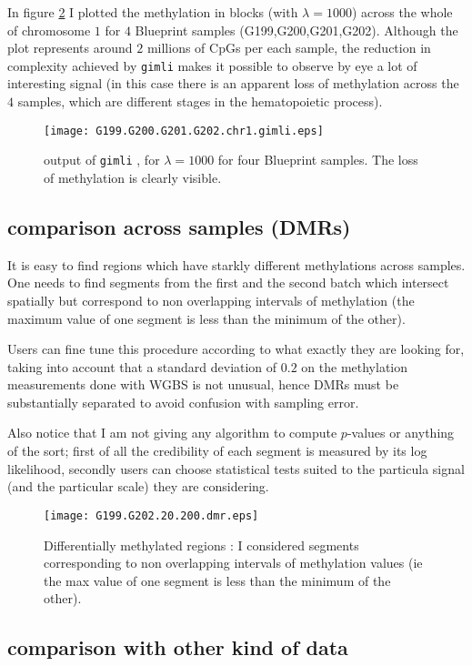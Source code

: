 \documentclass[11pt]{amsart}
\newcommand{\gimli}{\texttt{gimli} }
\begin{document}
In figure \ref{ex1} I plotted the methylation in blocks (with $\lambda=1000$) 
across the whole of chromosome $1$ for $4$ Blueprint samples
(G199,G200,G201,G202). Although the plot represents around $2$ millions of 
CpGs per each sample, the reduction in complexity achieved by \gimli makes it 
possible to observe by eye a lot of interesting signal (in this case there is 
an apparent loss of methylation across the $4$ samples, which are different 
stages in the hematopoietic process).

\begin{figure}\label{ex1}
\texttt{[image: G199.G200.G201.G202.chr1.gimli.eps]}
\caption{output of \gimli, for $\lambda=1000$ for four Blueprint samples. The loss of
methylation is clearly visible.}
\end{figure}

\subsection{comparison across samples (DMRs)}

It is easy to find regions which have starkly different 
methylations across samples. One needs to find segments 
from the first and the second batch which intersect spatially
but correspond to non overlapping intervals of methylation 
(the maximum value of one 
segment is less than the minimum of the other).

Users can fine tune this procedure according to what exactly they 
are looking for, taking into account that a standard deviation of $0.2$
on the methylation measurements done with WGBS is not unusual, hence
DMRs must be substantially separated to avoid confusion with sampling error.

Also notice that I am not giving any algorithm to compute $p$-values
or anything of the sort; first of all the credibility of each segment
is measured by its log likelihood, secondly users can choose statistical
tests suited to the particula signal (and the particular scale)
they are considering.

\begin{figure}\label{ex1}
\texttt{[image: G199.G202.20.200.dmr.eps]}
\caption{Differentially methylated regions : I considered segments corresponding to
non overlapping intervals of methylation values (ie the max value of one 
segment is less than the minimum of the other).}
\end{figure}

\subsection{comparison with other kind of data}
\end{document}
